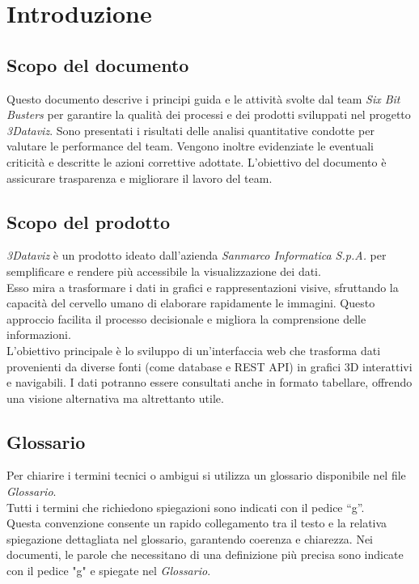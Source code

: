     \section{Introduzione}
    \subsection{Scopo del documento}
        Questo documento descrive i principi guida e le attività svolte dal team \textit{Six Bit Busters} per garantire la qualità dei processi e dei prodotti sviluppati nel progetto \textit{3Dataviz}.  
        Sono presentati i risultati delle analisi quantitative condotte per valutare le performance del team. Vengono inoltre evidenziate le eventuali criticità e descritte le azioni correttive adottate.
        L'obiettivo del documento è assicurare trasparenza e migliorare il lavoro del team.
        
    \subsection{Scopo del prodotto}
        \textit{3Dataviz} è un prodotto ideato dall'azienda \textit{Sanmarco Informatica S.p.A.} per semplificare e rendere più accessibile la visualizzazione dei dati.\\
        Esso mira a trasformare i dati in grafici e rappresentazioni visive, sfruttando la capacità del cervello umano di elaborare rapidamente le immagini. 
        Questo approccio facilita il processo decisionale e migliora la comprensione delle informazioni.\\
        L’obiettivo principale è lo sviluppo di un’interfaccia web che trasforma dati provenienti da diverse fonti (come database e REST API) in grafici 3D interattivi e navigabili. 
        I dati potranno essere consultati anche in formato tabellare, offrendo una visione alternativa ma altrettanto utile.  
        
    \subsection{Glossario}
        Per chiarire i termini tecnici o ambigui si utilizza un glossario disponibile nel file \textit{Glossario}.\\
        Tutti i termini che richiedono spiegazioni sono indicati con il pedice “g”. \\
        Questa convenzione consente un rapido collegamento tra il testo e la relativa spiegazione dettagliata nel glossario, garantendo coerenza e chiarezza.  Nei documenti, le parole che necessitano di una definizione più precisa sono indicate con il pedice "g" e spiegate nel \textit{Glossario}.

